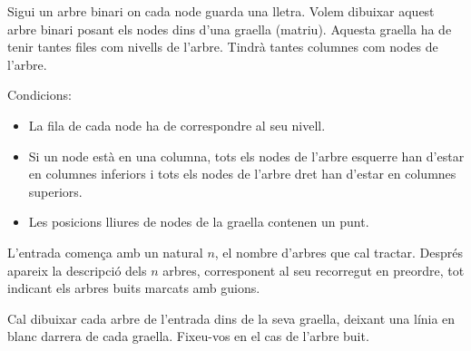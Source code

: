 
\Statement

Sigui un arbre binari on cada node guarda una lletra.
Volem dibuixar aquest arbre binari posant els nodes dins d'una graella (matriu).
Aquesta graella ha de tenir tantes files com nivells de l'arbre. Tindrà tantes
columnes com nodes de l'arbre.

\medskip

Condicions:

\begin{itemize}

    \item La fila de cada node ha de correspondre al seu nivell.

    \item Si un node està en una columna, tots els nodes de l'arbre esquerre han d'estar en columnes inferiors
    i tots els nodes de l'arbre dret han d'estar en columnes superiors.

    \item Les posicions lliures de nodes de la graella contenen un punt.

\end{itemize}



\Input

L’entrada comença amb un natural $n$, el nombre d’arbres que cal tractar.
Després apareix la descripció dels $n$ arbres, corresponent al seu recorregut en
preordre, tot indicant els arbres buits marcats amb guions.


\Output

Cal dibuixar cada arbre de l'entrada dins de la seva graella, deixant una línia
en blanc darrera de cada graella. Fixeu-vos en el cas de l'arbre buit.


\SampleTwoCol
